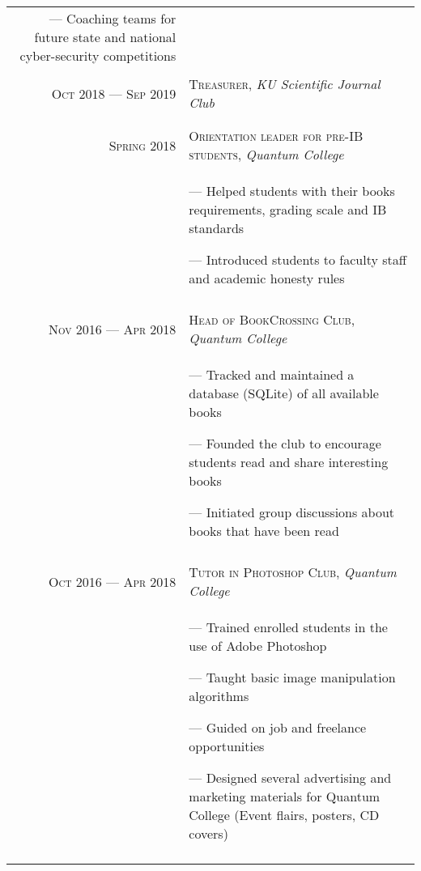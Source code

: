 \documentclass[a4paper, 10pt]{article}
\begin{document}
\begin{tabular}{r|p{11cm}}
{		--- Coaching teams for future state and national cyber-security competitions
	}                                                                                                        \\\multicolumn{2}{c}{}\\

	\textsc{Oct 2018 --- Sep 2019} & \textsc{Treasurer}, \emph{KU Scientific Journal Club}                   \\&\footnotesize{
	}                                                                                                        \\\multicolumn{2}{c}{}\\


	\textsc{Spring 2018}           & \textsc{Orientation leader for pre-IB students}, \emph{Quantum College} \\&\footnotesize{
		--- Helped students with their books requirements, grading scale and IB standards

		--- Introduced students to faculty staff and academic honesty rules
	}                                                                                                        \\\multicolumn{2}{c}{}\\

	\textsc{Nov 2016 --- Apr 2018} & \textsc{Head of BookCrossing Club}, \emph{Quantum College}              \\&\footnotesize{
		--- Tracked and maintained a database (SQLite) of all available books

		--- Founded the club to encourage students read and share interesting books

		--- Initiated group discussions about books that have been read
	}                                                                                                        \\\multicolumn{2}{c}{}\\

	\textsc{Oct 2016 --- Apr 2018} & \textsc{Tutor in Photoshop Club}, \emph{Quantum College}                \\&\footnotesize{
		--- Trained enrolled students in the use of Adobe Photoshop

		--- Taught basic image manipulation algorithms

		--- Guided on job and freelance opportunities

		--- Designed several advertising and marketing materials for Quantum College (Event flairs, posters, CD covers)
	}                                                                                                        \\\multicolumn{2}{c}{}\\
\end{tabular}
\end{document}
